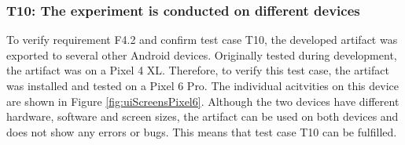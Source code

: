\newpage

\subsubsection*{T10: The experiment is conducted on different devices}

To verify requirement F4.2 and confirm test case T10, the developed artifact was exported to several other Android devices. Originally tested during development, the artifact was on a Pixel 4 XL. Therefore, to verify this test case, the artifact was installed and tested on a Pixel 6 Pro. The individual acitvities on this device are shown in Figure \ref{fig:uiScreensPixel6}. Although the two devices have different hardware, software and screen sizes, the artifact can be used on both devices and does not show any errors or bugs. This means that test case T10 can be fulfilled.

